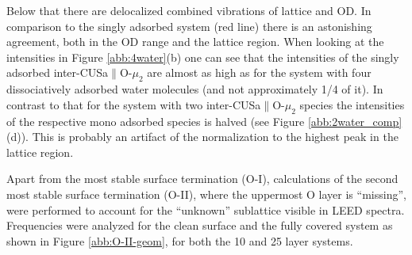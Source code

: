 \documentclass[11pt,DIV=13,BCOR=5mm,a4paper,headinclude]{scrbook}
\begin{document}
Below that there are delocalized combined vibrations of lattice and OD.
In comparison to the singly adsorbed system (red line) there is an astonishing agreement, both in the OD range and the lattice region.
When looking at the intensities in Figure \ref{abb:4water}(b) one can see that the intensities of the singly adsorbed inter-CUSa$\parallel$O-$\mu_2$ are almost as high as for the system with four dissociatively adsorbed water molecules (and not approximately 1/4 of it).
In contrast to that for the system with two inter-CUSa$\parallel$O-$\mu_2$ species the intensities of the respective mono adsorbed species is halved (see Figure \ref{abb:2water_comp}(d)).
This is probably an artifact of the normalization to the highest peak in the lattice region.


Apart from the most stable surface termination (O-I), calculations of the second most stable surface termination (O-II), where the uppermost O layer is ``missing'', were performed to account for the ``unknown'' sublattice visible in LEED spectra.
Frequencies were analyzed for the clean surface and the fully covered system as shown in Figure \ref{abb:O-II-geom}, for both the 10 and 25 layer systems.
\end{document}
